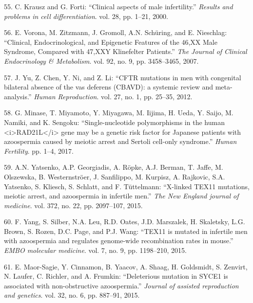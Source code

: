 \documentclass[12pt,twoside]{reedthesis}
\theoremstyle{definition}
\theoremstyle{definition}
\theoremstyle{remark}
\begin{document}
  \hypertarget{ref-Krausz2000}{}
  55. C. Krausz and G. Forti: ``Clinical aspects of male infertility.''
  \emph{Results and problems in cell differentiation}. vol. 28, pp. 1--21,
  2000.
  
  \hypertarget{ref-Vorona2007}{}
  56. E. Vorona, M. Zitzmann, J. Gromoll, A.N. Schüring, and E. Nieschlag:
  ``Clinical, Endocrinological, and Epigenetic Features of the 46,XX Male
  Syndrome, Compared with 47,XXY Klinefelter Patients.'' \emph{The Journal
  of Clinical Endocrinology \& Metabolism}. vol. 92, no. 9, pp.
  3458--3465, 2007.
  
  \hypertarget{ref-Yu2012}{}
  57. J. Yu, Z. Chen, Y. Ni, and Z. Li: ``CFTR mutations in men with
  congenital bilateral absence of the vas deferens (CBAVD): a systemic
  review and meta-analysis.'' \emph{Human Reproduction}. vol. 27, no. 1,
  pp. 25--35, 2012.
  
  \hypertarget{ref-Minase2017}{}
  58. G. Minase, T. Miyamoto, Y. Miyagawa, M. Iijima, H. Ueda, Y. Saijo,
  M. Namiki, and K. Sengoku: ``Single-nucleotide polymorphisms in the
  human \textless{}i\textgreater{}RAD21L\textless{}/i\textgreater{} gene
  may be a genetic risk factor for Japanese patients with azoospermia
  caused by meiotic arrest and Sertoli cell-only syndrome.'' \emph{Human
  Fertility}. pp. 1--4, 2017.
  
  \hypertarget{ref-Yatsenko2015}{}
  59. A.N. Yatsenko, A.P. Georgiadis, A. Röpke, A.J. Berman, T. Jaffe, M.
  Olszewska, B. Westernströer, J. Sanfilippo, M. Kurpisz, A. Rajkovic,
  S.A. Yatsenko, S. Kliesch, S. Schlatt, and F. Tüttelmann: ``X-linked
  TEX11 mutations, meiotic arrest, and azoospermia in infertile men.''
  \emph{The New England journal of medicine}. vol. 372, no. 22, pp.
  2097--107, 2015.
  
  \hypertarget{ref-Yang2015}{}
  60. F. Yang, S. Silber, N.A. Leu, R.D. Oates, J.D. Marszalek, H.
  Skaletsky, L.G. Brown, S. Rozen, D.C. Page, and P.J. Wang: ``TEX11 is
  mutated in infertile men with azoospermia and regulates genome-wide
  recombination rates in mouse.'' \emph{EMBO molecular medicine}. vol. 7,
  no. 9, pp. 1198--210, 2015.
  
  \hypertarget{ref-Maor-Sagie2015}{}
  61. E. Maor-Sagie, Y. Cinnamon, B. Yaacov, A. Shaag, H. Goldsmidt, S.
  Zenvirt, N. Laufer, C. Richler, and A. Frumkin: ``Deleterious mutation
  in SYCE1 is associated with non-obstructive azoospermia.'' \emph{Journal
  of assisted reproduction and genetics}. vol. 32, no. 6, pp. 887--91,
  2015.
  
\end{document}
